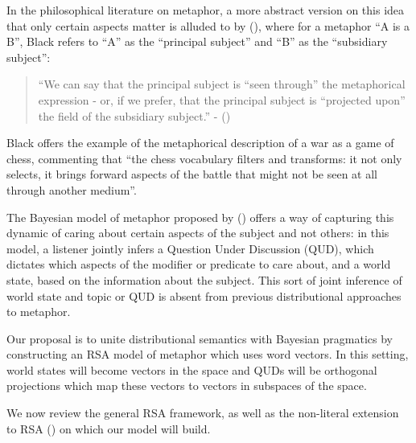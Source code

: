 \documentclass[10pt,letterpaper,twocolumn]{article}
\begin{document}
In the philosophical literature on metaphor, a more abstract version on this idea that only certain aspects matter is alluded to by (\cite{black}), where for a metaphor ``A is a B'', Black refers to ``A'' as the ``principal subject'' and ``B'' as the ``subsidiary subject'':
		\begin{quote}
``We can say that the principal subject is  ``seen through'' the metaphorical expression - or, if we prefer, that the principal subject is ``projected upon'' the field of the subsidiary subject.'' - (\cite{black})
\end{quote}

Black offers the example of the metaphorical description of a war as a game of chess, commenting that ``the chess vocabulary filters and transforms: it not only selects, it brings forward aspects of the battle that might not be seen at all through another medium''.

The Bayesian model of metaphor proposed by (\cite{kao}) offers a way of capturing this dynamic of caring about certain aspects of the subject and not others: in this model, a listener jointly infers a Question Under Discussion (QUD), which dictates which aspects of the modifier or predicate to care about, and a world state, based on the information about the subject. This sort of joint inference of world state and topic or QUD is absent from previous distributional approaches to metaphor.

Our proposal is to unite distributional semantics with Bayesian pragmatics by constructing an RSA model of metaphor which uses word vectors. In this setting, world states will become vectors in the space and QUDs will be orthogonal projections which map these vectors to vectors in subspaces of the space.

We now review the general RSA framework, as well as the non-literal extension to RSA (\cite{kao}) on which our model will build.




\end{document}

